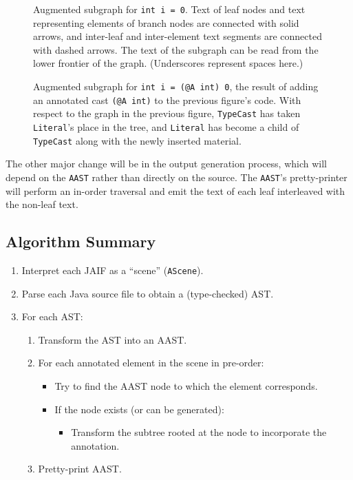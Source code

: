 \documentclass{article}
\begin{document}
\begin{figure}[ht]
\begin{center}
\end{center}
\caption{
Augmented subgraph for \texttt{int i = 0}.  Text of leaf nodes and text
representing elements of branch nodes are connected with solid arrows,
and inter-leaf and inter-element text segments are connected with dashed
arrows.  The text of the subgraph can be read from the lower frontier of
the graph.  (Underscores represent spaces here.)
}
\label{fig:nocast}
\end{figure}

\begin{figure}[ht]
\begin{center}
\end{center}
\caption{
Augmented subgraph for \texttt{int i = (@A int) 0}, the result of adding
an annotated cast \texttt{(@A int)} to the previous figure's code.  With
respect to the graph in the previous figure, \texttt{TypeCast} has taken
\texttt{Literal}'s place in the tree, and \texttt{Literal} has become a
child of \texttt{TypeCast} along with the newly inserted material.
}
\label{fig:typecast}
\end{figure}

The other major change will be in the output generation process, which
will depend on the \texttt{AAST} rather than directly on the source.
The \texttt{AAST}'s pretty-printer will perform an in-order traversal
and emit the text of each leaf interleaved with the non-leaf text.

\subsection{Algorithm Summary}

\begin{enumerate}
\item  Interpret each JAIF as a ``scene'' (\texttt{AScene}).
\item  Parse each Java source file to obtain a (type-checked) AST.
\item  For each AST:
\begin{enumerate}
\item  Transform the AST into an AAST.
\item  For each annotated element in the scene in pre-order:
\begin{itemize}
\item  Try to find the AAST node to which the element corresponds.
\item  If the node exists (or can be generated):
\begin{itemize}
\item  Transform the subtree rooted at the node to incorporate the
annotation.
\end{itemize}
\end{itemize}
\item  Pretty-print AAST.
\end{enumerate}
\end{enumerate}
\end{document}
